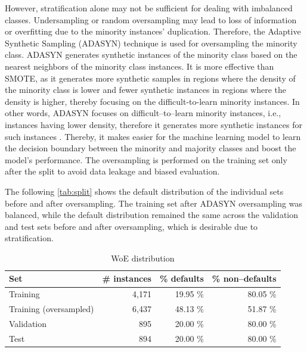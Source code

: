 However, stratification alone may not be sufficient for dealing with imbalanced classes.
Undersampling or random oversampling may lead to loss of information or overfitting due to the minority instances' duplication.
Therefore, the Adaptive Synthetic Sampling (ADASYN) technique is used for oversampling the minority class.
ADASYN generates synthetic instances of the minority class based on the nearest neighbors of the minority class instances.
It is more effective than SMOTE, as it generates more synthetic samples in regions where the density of the minority class is lower and fewer synthetic instances in regions where the density is higher, thereby focusing on the difficult-to-learn minority instances.
In other words, ADASYN focuses on difficult--to--learn minority instances, i.e., instances having lower density, therefore it generates more synthetic instances for such instances \citep{adasynhaibo}.
Thereby, it makes easier for the machine learning model to learn the decision boundary between the minority and majority classes and boost the model's performance. 
The oversampling is performed on the training set only after the split to avoid data leakage and biased evaluation.

The following \autoref{tab:split} shows the default distribution of the individual sets before and after oversampling. The training set after ADASYN oversampling was balanced, while the default distribution remained the same across the validation and test sets before and after oversampling, which is desirable due to stratification.

\begin{table}[H]
    \small
    \setlength{\tabcolsep}{8pt}
    \renewcommand{\arraystretch}{1.3}
    \centering
        \caption[WoE distribution]{WoE distribution}\label{tab:split}
        \begin{tabular}{lrrr}
    \toprule
    \textbf{Set} & \textbf{\# instances} & \textbf{\% defaults} & \textbf{\% non--defaults}\\
    \midrule
    \hline
    Training & 4,171  & 19.95 \% & 80.05 \% \\
    Training (oversampled) & 6,437 &  48.13 \% & 51.87 \% \\

    Validation & 895 &  20.00 \% & 80.00 \% \\

    Test & 894 &  20.00 \% & 80.00 \% \\
    \bottomrule
    \end{tabular}
    \vspace{0.7em}

    \vspace{-1em}
\end{table}

